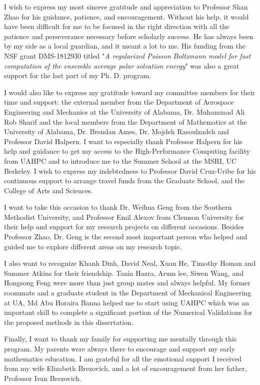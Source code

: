 I wish to express my most sincere gratitude and appreciation to Professor Shan Zhao for his guidance, patience, and encouragement. Without his help, it would have been difficult for me to be focused in the right direction with all the patience and perseverance necessary before scholarly success. He has always been by my side as a local guardian, and it meant a lot to me.  His funding from the NSF grant DMS-1812930 titled "{\it A regularized Poisson Boltzmann model for fast computation of the ensemble average polar solvation energy}" was also a great support for the last part of my Ph. D. program. 

I would also like to express my gratitude toward my committee members for their time and support: the external member from the Department of Aerospace Engineering and Mechanics at the University of Alabama, Dr. Muhammad Ali Rob Sharif and the local members from the Department of Mathematics at the University of Alabama, Dr. Brendan Ames, Dr. Mojdeh Rasoulzadeh and Professor David Halpern. I want to especially thank Professor Halpern for his help and guidance to get my access to the High-Performance Computing facility from UAHPC and to introduce me to the Summer School at the MSRI, UC Berkeley. I wish to express my indebtedness to Professor David Cruz-Uribe for his continuous support to arrange travel funds from the Graduate School, and the College of Arts and Sciences. 

I want to take this occasion to thank Dr. Weihua Geng from the Southern Methodist University, and Professor Emil Alexov from Clemson University for their help and support for my research projects on different occasions. Besides Professor Zhao, Dr. Geng is the second most important person who helped and guided me to explore different areas on my research topic. 

I also want to recognize Khanh Dinh, David Neal, Xuan He, Timothy Homan and Summer Atkins for their friendship. Tania Hazra, Arum lee, Siwen Wang, and Hongsong Feng were more than just group mates and always helpful. My former roommate and a graduate student in the Department of Mechanical Engineering at UA, Md Abu Horaira Banna helped me to start using UAHPC which was an important skill to complete a significant portion of the Numerical Validations for the proposed methods in this dissertation. 

Finally, I want to thank my family for supporting me mentally through this program. My parents were always there to encourage and support my early mathematics education. I am grateful for all the emotional support I received from my wife Elizabeth Brezovich, and a lot of encouragement from her father, Professor Ivan Brezovich. 
